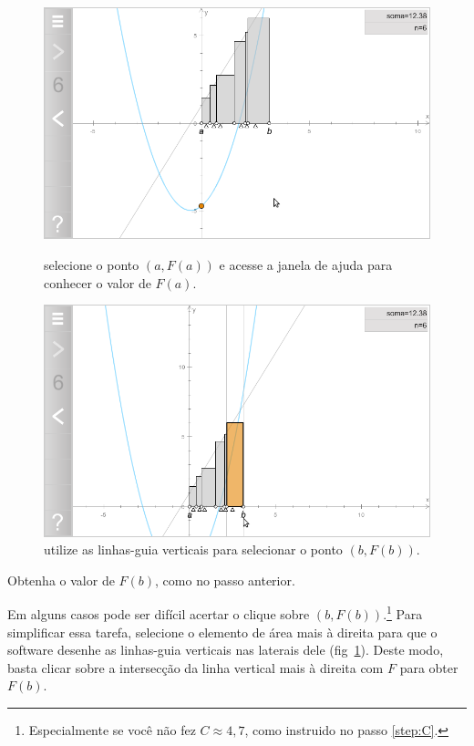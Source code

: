 \documentclass[a4paper,12pt]{scrartcl}
\begin{document}
\begin{compactenum}
      \begin{figure}
	\begin{minipage}[t]{0.49\textwidth}
	  \includegraphics[width=\textwidth]{F(a).png}	  
	  \caption{selecione o ponto $\left(a,F(a)\right)$ e acesse a janela de ajuda para conhecer o valor de $F(a)$.}
	  \label{fig:F(a)}
	\end{minipage}
	\hfill
	\begin{minipage}[t]{0.49\textwidth}
	  \includegraphics[width=\textwidth]{linhas-guia.png}
	  \caption{utilize as linhas-guia verticais para selecionar o ponto $\left(b,F(b)\right)$.}
	  \label{fig:linhas-guia}
	\end{minipage}	
      \end{figure}
      
      \item Obtenha o valor de $F(b)$, como no passo anterior.
      
      Em alguns casos pode ser difícil acertar o clique sobre $\left(b,F(b)\right)$.\footnote{Especialmente se você não fez $C \approx 4,7$, como instruido no passo \ref{step:C}.} Para simplificar essa tarefa, selecione o elemento de área mais à direita para que o software desenhe as linhas-guia verticais nas laterais dele (fig~\ref{fig:linhas-guia}). Deste modo, basta clicar sobre a intersecção da linha vertical mais à direita com $F$ para obter $F(b)$.
      

\end{compactenum}
\end{document}
